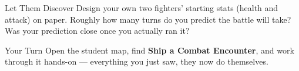 \documentclass[aspectratio=169]{beamer}
\begin{document}
\begin{frame}{Let Them Discover}
    \Large
    Design your own two fighters' starting stats (health and attack) on paper. Roughly how many turns do you predict the battle will take? Was your prediction close once you actually ran it?
\end{frame}

\begin{frame}{Your Turn}
    \Large
    Open the student map, find \textbf{Ship a Combat Encounter}, and work through it
    hands-on --- everything you just saw, they now do themselves.
\end{frame}
\end{document}
